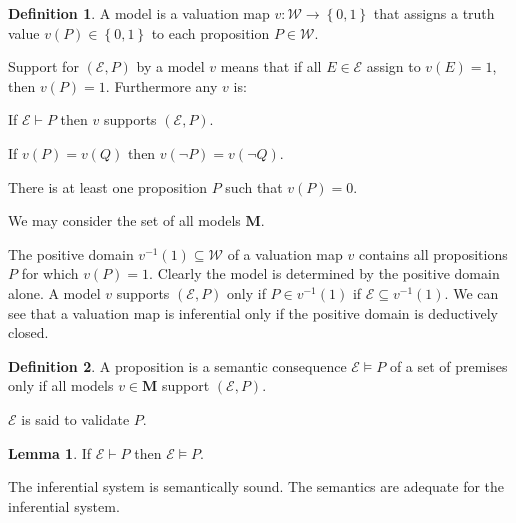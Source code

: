 \documentclass{amsbook}
\newcommand{\setsm}[1]{\left\{#1\right\}}
\newcommand{\wffs}{\mathcal W}
\newcommand{\infers}{\mathrel\vdash}
\newcommand{\valids}{\mathrel\vDash}
\theoremstyle{definition}
\newtheorem{lmm}{Lemma}[section]
\newtheorem{dfn}{Definition}[section]
\begin{document}
\begin{dfn}
    A model is a valuation map $v: \wffs \longrightarrow \setsm{0,1}$ that assigns a truth value $v(P) \in \setsm{0,1}$ to each proposition $P \in \wffs$.

    Support for $(\mathcal E, P)$ by a model $v$ means that if all $E \in \mathcal E$ assign to $v(E) = 1$, then $v(P) = 1$. Furthermore any $v$ is:
    \begin{description}[
            labelindent=\parindent,
            before={
                    \renewcommand\makelabel[1]{(##1).}
                }
        ]
        \item [inferential] If $\mathcal E \infers P$ then $v$ supports $(\mathcal E, P)$.
        \item [regular with respect to negation] If $v(P) = v(Q)$ then $v(\neg P) = v(\neg Q)$.
        \item [not trivial] There is at least one proposition $P$ such that $v(P) = 0$.
    \end{description}
    We may consider the set of all models $\mathbf M$.
\end{dfn}

The positive domain $v^{-1}(1) \subseteq \wffs$ of a valuation map $v$ contains all propositions $P$ for which $v(P) = 1$. Clearly the model is determined by the positive domain alone. A model $v$ supports $(\mathcal E, P)$ only if $P \in v^{-1}(1)$ if $\mathcal E \subseteq v^{-1}(1)$. We can see that a valuation map is inferential only if the positive domain is deductively closed.

\begin{dfn}
    A proposition is a semantic consequence $\mathcal E \valids P$ of a set of premises only if all models $v \in \mathbf M$ support $(\mathcal E, P)$.

    $\mathcal E$ is said to validate $P$.
\end{dfn}

\begin{lmm}
    If $\mathcal E \infers P$ then $\mathcal E \valids P$.

    The inferential system is semantically sound. The semantics are adequate for the inferential system.
\end{lmm}
\end{document}
